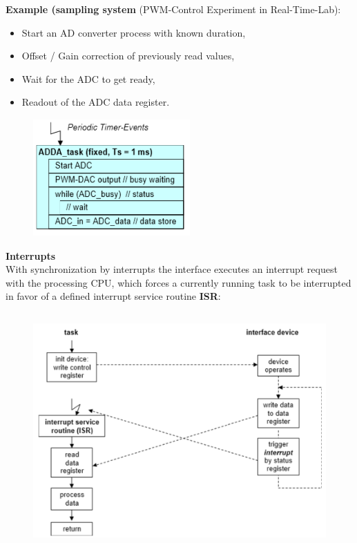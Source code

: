 \textbf{Example (sampling system }(PWM-Control Experiment in Real-Time-Lab): 

\begin{itemize}
	\item  Start an AD converter process with known duration, 
	\item  Offset / Gain correction of previously read values,
	\item  Wait for the ADC to get ready,
	\item  Readout of the ADC data register.
\end{itemize}

 	\begin{figure}[h]
    \centering
    \includegraphics[width=6cm, height=4.5cm]{Images/image125.png}
    \label{fig:Fig }
    \end{figure}
\newpage
{\rot\bf Interrupts}\\

With synchronization by interrupts the interface executes an interrupt request with the processing CPU, which forces a currently running task to be interrupted in favor of a defined interrupt service routine \textbf{ISR}:

 	\begin{figure}[h]
    \centering
    \includegraphics[width=14cm, height=9cm]{Images/image126.png}
    \label{fig:Fig }
    \end{figure}


